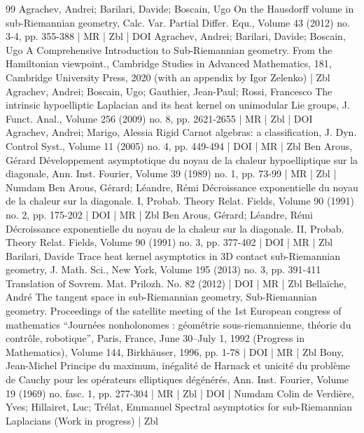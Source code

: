 \documentclass[10pt]{amsart}
\theoremstyle{definition}\newtheorem{defi}[theo]{Definition}\newtheorem{rema}[theo]{Remark}\newtheorem{exam}[theo]{Example}\newtheorem{exem}[theo]{Example}\newtheorem{nota}[theo]{Notation}
\begin{document}
\newpage


\begin{thebibliography}{99}
Agrachev, Andrei; Barilari, Davide; Boscain, Ugo On the Hausdorff volume in sub-Riemannian geometry, Calc. Var. Partial Differ. Equ., Volume 43 (2012) no. 3-4, pp. 355-388 | MR | Zbl | DOI
Agrachev, Andrei; Barilari, Davide; Boscain, Ugo A Comprehensive Introduction to Sub-Riemannian geometry. From the Hamiltonian viewpoint., Cambridge Studies in Advanced Mathematics, 181, Cambridge University Press, 2020 (with an appendix by Igor Zelenko) | Zbl
Agrachev, Andrei; Boscain, Ugo; Gauthier, Jean-Paul; Rossi, Francesco The intrinsic hypoelliptic Laplacian and its heat kernel on unimodular Lie groups, J. Funct. Anal., Volume 256 (2009) no. 8, pp. 2621-2655 | MR | Zbl | DOI
Agrachev, Andrei; Marigo, Alessia Rigid Carnot algebras: a classification, J. Dyn. Control Syst., Volume 11 (2005) no. 4, pp. 449-494 | DOI | MR | Zbl
Ben Arous, Gérard Développement asymptotique du noyau de la chaleur hypoelliptique sur la diagonale, Ann. Inst. Fourier, Volume 39 (1989) no. 1, pp. 73-99 | MR | Zbl | Numdam
Ben Arous, Gérard; Léandre, Rémi Décroissance exponentielle du noyau de la chaleur sur la diagonale. I, Probab. Theory Relat. Fields, Volume 90 (1991) no. 2, pp. 175-202 | DOI | MR | Zbl
Ben Arous, Gérard; Léandre, Rémi Décroissance exponentielle du noyau de la chaleur sur la diagonale. II, Probab. Theory Relat. Fields, Volume 90 (1991) no. 3, pp. 377-402 | DOI | MR | Zbl
Barilari, Davide Trace heat kernel asymptotics in 3D contact sub-Riemannian geometry, J. Math. Sci., New York, Volume 195 (2013) no. 3, pp. 391-411 Translation of Sovrem. Mat. Prilozh. No. 82 (2012) | DOI | MR | Zbl
Bellaïche, André The tangent space in sub-Riemannian geometry, Sub-Riemannian geometry. Proceedings of the satellite meeting of the 1st European congress of mathematics “Journées nonholonomes : géométrie sous-riemannienne, théorie du contrôle, robotique”, Paris, France, June 30–July 1, 1992 (Progress in Mathematics), Volume 144, Birkhäuser, 1996, pp. 1-78 | DOI | MR | Zbl
Bony, Jean-Michel Principe du maximum, inégalité de Harnack et unicité du problème de Cauchy pour les opérateurs elliptiques dégénérés, Ann. Inst. Fourier, Volume 19 (1969) no. fasc. 1, pp. 277-304 | MR | Zbl | DOI | Numdam
Colin de Verdière, Yves; Hillairet, Luc; Trélat, Emmanuel Spectral asymptotics for sub-Riemannian Laplacians (Work in progress) | Zbl

\end{thebibliography}
\end{document}
